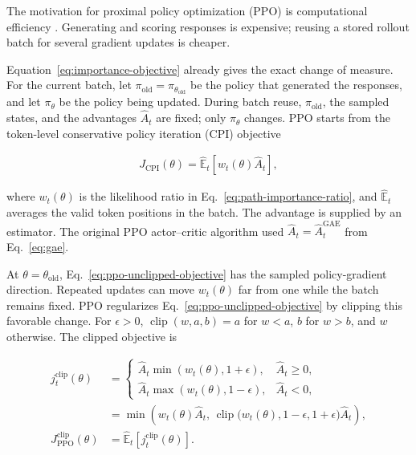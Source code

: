 \documentclass[11pt]{article}
\newcommand{\E}{\mathbb{E}}
\begin{document}
The motivation for proximal policy optimization (PPO) is computational
efficiency \cite{schulman2017ppo}.  Generating and scoring responses is
expensive; reusing a stored rollout batch for several gradient updates is
cheaper.

Equation~\eqref{eq:importance-objective} already gives the exact
change of measure.  For the current batch, let
\(\pi_{\mathrm{old}}=\pi_{\theta_{\mathrm{old}}}\) be the policy that
generated the responses, and let \(\pi_\theta\) be the policy being updated.
During batch reuse, \(\pi_{\mathrm{old}}\), the sampled states, and the
advantages \(\widehat A_t\) are fixed; only \(\pi_\theta\) changes.  PPO starts
from the token-level conservative policy iteration (CPI) objective

\begin{equation}
    \begin{split}
        J_{\mathrm{CPI}}(\theta)
        =\widehat{\E}_t
         \left[w_t(\theta)\widehat A_t\right],
    \end{split}
    \label{eq:ppo-unclipped-objective}
\end{equation}

where \(w_t(\theta)\) is the likelihood ratio in
Eq.~\eqref{eq:path-importance-ratio}, and \(\widehat{\E}_t\) averages the
valid token positions in the batch.  The advantage is supplied by an
estimator.  The original PPO actor--critic algorithm used
\(\widehat A_t=\widehat A_t^{\mathrm{GAE}}\) from Eq.~\eqref{eq:gae}.

At \(\theta=\theta_{\mathrm{old}}\), Eq.~\eqref{eq:ppo-unclipped-objective}
has the sampled policy-gradient direction.  Repeated updates can move
\(w_t(\theta)\) far from one while the batch remains fixed.  PPO regularizes
Eq.~\eqref{eq:ppo-unclipped-objective} by clipping this favorable change.
For \(\epsilon>0\),
\(\operatorname{clip}(w,a,b)=a\) for \(w<a\), \(b\) for \(w>b\), and \(w\)
otherwise.  The clipped objective is \cite{schulman2017ppo}

\begin{equation}
    \begin{split}
    j_t^{\mathrm{clip}}(\theta)
      &=\begin{cases}
        \widehat A_t\min\!\left(w_t(\theta),1+\epsilon\right),
          & \widehat A_t\geq0,\\
        \widehat A_t\max\!\left(w_t(\theta),1-\epsilon\right),
          & \widehat A_t<0,
        \end{cases}\\
      &=\min\!\left(
          w_t(\theta)\widehat A_t,\,
          \operatorname{clip}
          \bigl(w_t(\theta),1-\epsilon,1+\epsilon\bigr)
          \widehat A_t
       \right),\\
    J_{\mathrm{PPO}}^{\mathrm{clip}}(\theta)
      &=\widehat{\E}_t\left[j_t^{\mathrm{clip}}(\theta)\right].
    \end{split}
    \label{eq:ppo-clipped-objective}
\end{equation}
\end{document}
